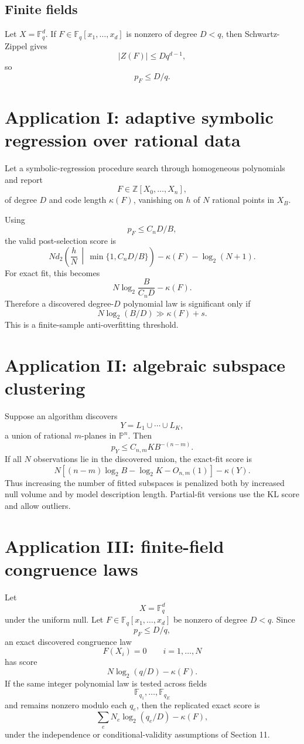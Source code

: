 \documentclass[11pt]{article}
\begin{document}
\subsection{Finite fields}

Let $X=\mathbb F_q^d$. If $F\in\mathbb F_q[x_1,\dots,x_d]$ is nonzero of degree $D<q$, then Schwartz-Zippel gives
\[
|Z(F)|\le Dq^{d-1},
\]
so
\[
p_F\le D/q.
\]

\section{Application I: adaptive symbolic regression over rational data}

Let a symbolic-regression procedure search through homogeneous polynomials and report
\[
F\in\mathbb Z[X_0,\dots,X_n],
\]
of degree $D$ and code length $\kappa(F)$, vanishing on $h$ of $N$ rational points in $X_B$.

Using
\[
p_F\le C_nD/B,
\]
the valid post-selection score is
\[
N d_2\left(\frac hN\,\middle|\,\min\{1,C_nD/B\}\right)
-\kappa(F)-\log_2(N+1).
\]
For exact fit, this becomes
\[
N\log_2\frac{B}{C_nD}-\kappa(F).
\]
Therefore a discovered degree-$D$ polynomial law is significant only if
\[
N\log_2(B/D)\gg \kappa(F)+s.
\]
This is a finite-sample anti-overfitting threshold.

\section{Application II: algebraic subspace clustering}

Suppose an algorithm discovers
\[
Y=L_1\cup\cdots\cup L_K,
\]
a union of rational $m$-planes in $\mathbb P^n$. Then
\[
p_Y\le C_{n,m}K B^{-(n-m)}.
\]
If all $N$ observations lie in the discovered union, the exact-fit score is
\[
N\left[(n-m)\log_2B-\log_2K-O_{n,m}(1)\right]
-\kappa(Y).
\]
Thus increasing the number of fitted subspaces is penalized both by increased null volume and by model description length. Partial-fit versions use the KL score and allow outliers.

\section{Application III: finite-field congruence laws}

Let
\[
X=\mathbb F_q^d
\]
under the uniform null. Let $F\in\mathbb F_q[x_1,\dots,x_d]$ be nonzero of degree $D<q$.
Since
\[
p_F\le D/q,
\]
an exact discovered congruence law
\[
F(X_i)=0\qquad i=1,\dots,N
\]
has score
\[
N\log_2(q/D)-\kappa(F).
\]
If the same integer polynomial law is tested across fields
\[
\mathbb F_{q_1},\dots,\mathbb F_{q_E}
\]
and remains nonzero modulo each $q_e$, then the replicated exact score is
\[
\sum_e N_e\log_2(q_e/D)-\kappa(F),
\]
under the independence or conditional-validity assumptions of Section 11.
\end{document}
